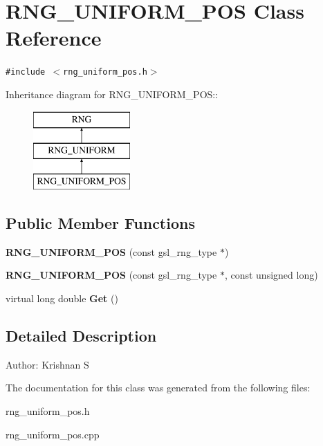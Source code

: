 \section{RNG\_\-UNIFORM\_\-POS Class Reference}
\label{classRNG__UNIFORM__POS}
{\tt \#include $<$rng\_\-uniform\_\-pos.h$>$}

Inheritance diagram for RNG\_\-UNIFORM\_\-POS::\begin{figure}[H]
\begin{center}
\leavevmode
\includegraphics[height=3cm]{classRNG__UNIFORM__POS}
\end{center}
\end{figure}
\subsection*{Public Member Functions}
\begin{CompactItemize}
\item 
\textbf{RNG\_\-UNIFORM\_\-POS} (const gsl\_\-rng\_\-type $\ast$)\label{classRNG__UNIFORM__POS_ef9266ce4a054dde077bb95cfa548757}

\item 
\textbf{RNG\_\-UNIFORM\_\-POS} (const gsl\_\-rng\_\-type $\ast$, const unsigned long)\label{classRNG__UNIFORM__POS_809eebfa6a3bd38f18c3d9c4b9d29781}

\item 
virtual long double \textbf{Get} ()\label{classRNG__UNIFORM__POS_bf2efb204d4b2fed4664239ec15d9ea9}

\end{CompactItemize}


\subsection{Detailed Description}
\begin{Desc}
\item[Author:]Krishnan S \end{Desc}




The documentation for this class was generated from the following files:\begin{CompactItemize}
\item 
rng\_\-uniform\_\-pos.h\item 
rng\_\-uniform\_\-pos.cpp\end{CompactItemize}
